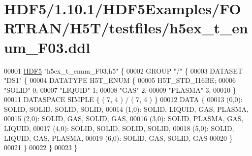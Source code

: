 \hypertarget{_h_d_f5_21_810_81_2_h_d_f5_examples_2_f_o_r_t_r_a_n_2_h5_t_2testfiles_2h5ex__t__enum___f03_8ddl_source}{}\section{H\+D\+F5/1.10.1/\+H\+D\+F5\+Examples/\+F\+O\+R\+T\+R\+A\+N/\+H5\+T/testfiles/h5ex\+\_\+t\+\_\+enum\+\_\+\+F03.ddl}
\label{_h_d_f5_21_810_81_2_h_d_f5_examples_2_f_o_r_t_r_a_n_2_h5_t_2testfiles_2h5ex__t__enum___f03_8ddl_source}

\begin{DoxyCode}
00001 \hyperlink{namespace_h_d_f5}{HDF5} \textcolor{stringliteral}{"h5ex\_t\_enum\_F03.h5"} \{
00002 GROUP \textcolor{stringliteral}{"/"} \{
00003    DATASET \textcolor{stringliteral}{"DS1"} \{
00004       DATATYPE  H5T\_ENUM \{
00005          H5T\_STD\_I16BE;
00006          \textcolor{stringliteral}{"SOLID"}            0;
00007          \textcolor{stringliteral}{"LIQUID"}           1;
00008          \textcolor{stringliteral}{"GAS"}              2;
00009          \textcolor{stringliteral}{"PLASMA"}           3;
00010       \}
00011       DATASPACE  SIMPLE \{ ( 7, 4 ) / ( 7, 4 ) \}
00012       DATA \{
00013       (0,0): SOLID, SOLID, SOLID, SOLID,
00014       (1,0): SOLID, LIQUID, GAS, PLASMA,
00015       (2,0): SOLID, GAS, SOLID, GAS,
00016       (3,0): SOLID, PLASMA, GAS, LIQUID,
00017       (4,0): SOLID, SOLID, SOLID, SOLID,
00018       (5,0): SOLID, LIQUID, GAS, PLASMA,
00019       (6,0): SOLID, GAS, SOLID, GAS
00020       \}
00021    \}
00022 \}
00023 \}
\end{DoxyCode}
